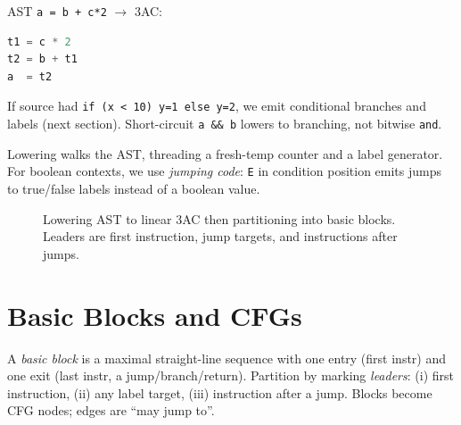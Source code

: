 \begin{example}
AST \texttt{a = b + c*2} $\to$ 3AC:
\begin{lstlisting}[language=C]
t1 = c * 2
t2 = b + t1
a  = t2
\end{lstlisting}
If source had \texttt{if (x < 10) y=1 else y=2}, we emit conditional branches and labels (next section). Short-circuit \texttt{a \&\& b} lowers to branching, not bitwise \texttt{and}.
\end{example}

Lowering walks the AST, threading a fresh-temp counter and a label generator. For boolean contexts, we use \emph{jumping code}: \texttt{E} in condition position emits jumps to true/false labels instead of a boolean value.

\begin{figure}[h]
\centering
{}
\caption{Lowering AST to linear 3AC then partitioning into basic blocks. Leaders are first instruction, jump targets, and instructions after jumps.}
\label{fig:ast-to-cfg}
\end{figure}

\section{Basic Blocks and CFGs}
\label{sec:cfg}
A \emph{basic block} is a maximal straight-line sequence with one entry (first instr) and one exit (last instr, a jump/branch/return). Partition by marking \emph{leaders}: (i) first instruction, (ii) any label target, (iii) instruction after a jump. Blocks become CFG nodes; edges are ``may jump to''.

